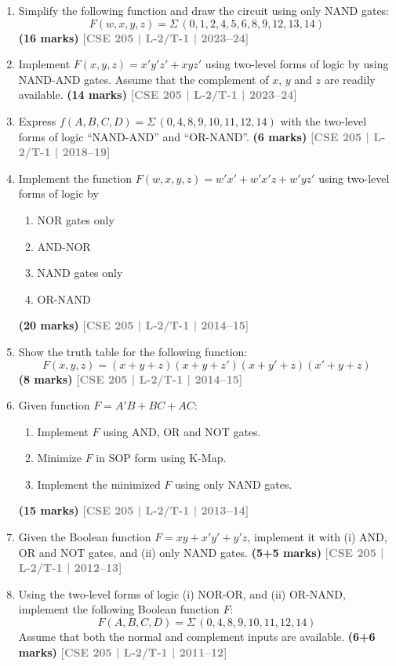 \documentclass[12pt]{article}
\newcommand{\yr}[1]{\hfill\textcolor{gray}{\small\textbf{[#1]}}}
\newcommand{\mk}[1]{\textcolor{orange!70!black}{\small\textbf{(#1 marks)}}}
\begin{document}
\begin{enumerate}

\item Simplify the following function and draw the circuit using only NAND gates:
\[ F(w,x,y,z) = \Sigma\,(0,1,2,4,5,6,8,9,12,13,14) \]
\mk{16} \yr{CSE 205 | L-2/T-1 | 2023--24}


\item Implement $F(x,y,z) = x'y'z' + xyz'$ using two-level forms of logic by using NAND-AND gates. Assume that the complement of $x$, $y$ and $z$ are readily available.
\mk{14} \yr{CSE 205 | L-2/T-1 | 2023--24}

\item Express $f(A,B,C,D) = \Sigma\,(0,4,8,9,10,11,12,14)$ with the two-level forms of logic ``NAND-AND'' and ``OR-NAND''.
\mk{6} \yr{CSE 205 | L-2/T-1 | 2018--19}

\item Implement the function $F(w, x, y, z) = w'x' + w'x'z + w'yz'$ using two-level forms of logic by
\begin{enumerate}
  \item NOR gates only
  \item AND-NOR
  \item NAND gates only
  \item OR-NAND
\end{enumerate}
\mk{20} \yr{CSE 205 | L-2/T-1 | 2014--15}

\item Show the truth table for the following function:
\[ F(x, y, z) = (x+y+z)(x+y+z')(x+y'+z)(x'+y+z) \]
\mk{8} \yr{CSE 205 | L-2/T-1 | 2014--15}

\item Given function $F = A'B + BC + AC$:
\begin{enumerate}
  \item Implement $F$ using AND, OR and NOT gates.
  \item Minimize $F$ in SOP form using K-Map.
  \item Implement the minimized $F$ using only NAND gates.

\end{enumerate}
\mk{15} \yr{CSE 205 | L-2/T-1 | 2013--14}

\item Given the Boolean function $F = xy + x'y' + y'z$, implement it with (i) AND, OR and NOT gates, and (ii) only NAND gates.
\mk{5+5} \yr{CSE 205 | L-2/T-1 | 2012--13}

\item Using the two-level forms of logic (i) NOR-OR, and (ii) OR-NAND, implement the following Boolean function $F$:
\[ F(A,B,C,D) = \Sigma\,(0,4,8,9,10,11,12,14) \]
Assume that both the normal and complement inputs are available.
\mk{6+6} \yr{CSE 205 | L-2/T-1 | 2011--12}

\end{enumerate}
\end{document}
